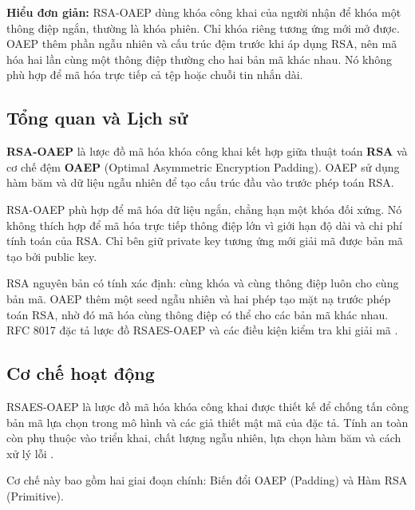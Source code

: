 \noindent\textbf{Hiểu đơn giản:} RSA-OAEP dùng khóa công khai của người nhận để khóa một thông điệp ngắn, thường là khóa phiên. Chỉ khóa riêng tương ứng mới mở được. OAEP thêm phần ngẫu nhiên và cấu trúc đệm trước khi áp dụng RSA, nên mã hóa hai lần cùng một thông điệp thường cho hai bản mã khác nhau. Nó không phù hợp để mã hóa trực tiếp cả tệp hoặc chuỗi tin nhắn dài.

\subsection{Tổng quan và Lịch sử }

\textbf{RSA-OAEP} là lược đồ mã hóa khóa công khai kết hợp giữa thuật toán \textbf{RSA} và cơ chế đệm \textbf{OAEP} (Optimal Asymmetric Encryption Padding). OAEP sử dụng hàm băm và dữ liệu ngẫu nhiên để tạo cấu trúc đầu vào trước phép toán RSA.

RSA-OAEP phù hợp để mã hóa dữ liệu ngắn, chẳng hạn một khóa đối xứng. Nó không thích hợp để mã hóa trực tiếp thông điệp lớn vì giới hạn độ dài và chi phí tính toán của RSA. Chỉ bên giữ private key tương ứng mới giải mã được bản mã tạo bởi public key.

RSA nguyên bản có tính xác định: cùng khóa và cùng thông điệp luôn cho cùng bản mã. OAEP thêm một seed ngẫu nhiên và hai phép tạo mặt nạ trước phép toán RSA, nhờ đó mã hóa cùng thông điệp có thể cho các bản mã khác nhau. RFC 8017 đặc tả lược đồ RSAES-OAEP và các điều kiện kiểm tra khi giải mã \cite{rsa8017}.
\subsection{Cơ chế hoạt động}

RSAES-OAEP là lược đồ mã hóa khóa công khai được thiết kế để chống tấn công bản mã lựa chọn trong mô hình và các giả thiết mật mã của đặc tả. Tính an toàn còn phụ thuộc vào triển khai, chất lượng ngẫu nhiên, lựa chọn hàm băm và cách xử lý lỗi \cite{rsa8017}.

Cơ chế này bao gồm hai giai đoạn chính: Biến đổi OAEP (Padding) và Hàm RSA (Primitive).

